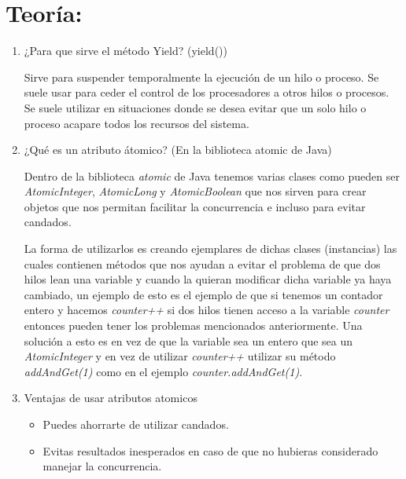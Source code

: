 \documentclass[12pt]{article}
\begin{document}
\section{Teoría:}
\begin{enumerate}
    \item ¿Para que sirve el método Yield? (yield())\\ \vspace{3mm}

    Sirve para suspender temporalmente la ejecuci\'on de un hilo o proceso. Se suele usar para ceder el control de los procesadores a otros hilos o procesos. Se suele utilizar en situaciones donde se desea evitar que un solo hilo o proceso acapare todos los recursos del sistema.\\ \vspace{3mm}
    
    \item ¿Qué es un atributo átomico? (En la biblioteca atomic de Java)\\ \vspace{3mm}

    Dentro de la biblioteca \textit{atomic} de Java tenemos varias clases como pueden ser \textit{AtomicInteger}, \textit{AtomicLong} y \textit{AtomicBoolean} que nos sirven para crear objetos que nos permitan facilitar la concurrencia e incluso para evitar candados.\\ \vspace{3mm}

    La forma de utilizarlos es creando ejemplares de dichas clases (instancias) las cuales contienen m\'etodos que nos ayudan a evitar el problema de que dos hilos lean una variable y cuando la quieran modificar dicha variable ya haya cambiado, un ejemplo de esto es el ejemplo de que si tenemos un contador entero y hacemos \textit{counter++} si dos hilos tienen acceso a la variable \textit{counter} entonces pueden tener los problemas mencionados anteriormente. Una soluci\'on a esto es en vez de que la variable sea un entero que sea un \textit{AtomicInteger} y en vez de utilizar \textit{counter++} utilizar su m\'etodo \textit{addAndGet(1)} como en el ejemplo \textit{counter.addAndGet(1)}.\\ \vspace{3mm}
    
    \item Ventajas de usar atributos atomicos\\ \vspace{3mm}

    \begin{itemize}
        \item Puedes ahorrarte de utilizar candados.
        \item Evitas resultados inesperados en caso de que no hubieras considerado manejar la concurrencia.
    \end{itemize}
    

\end{enumerate}
\end{document}
